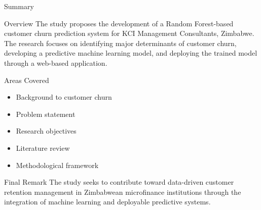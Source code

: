 \documentclass[10pt]{beamer}
\begin{document}
\begin{frame}{Summary}
	
	\small
	
	\begin{block}{Overview}
		The study proposes the development of a Random Forest-based customer churn prediction system for KCI Management Consultants, Zimbabwe. The research focuses on identifying major determinants of customer churn, developing a predictive machine learning model, and deploying the trained model through a web-based application.
	\end{block}
	
	\vspace{0.003cm}
	

		
		\begin{exampleblock}{Areas Covered}
			\begin{itemize}
				\item Background to customer churn
				
				\item Problem statement
				
				\item Research objectives
				
				\item Literature review
				
				\item Methodological framework
			\end{itemize}
		\end{exampleblock}
		

		

	
	\vspace{0.003cm}
	
	\begin{block}{Final Remark}
		The study seeks to contribute toward data-driven customer retention management in Zimbabwean microfinance institutions through the integration of machine learning and deployable predictive systems.
	\end{block}
	
\end{frame}
\end{document}
